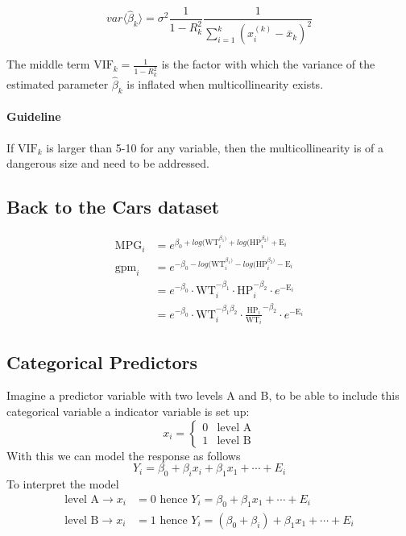 \documentclass[11pt]{article}
\begin{document}
\begin{equation*}
	var\langle \widehat{\beta}_k \rangle = \sigma^2 \frac{1}{1-R_k^2}\frac{1}{\sum_{i=1}^k (x_i^{(k)} - \bar{x}_k)^2}
\end{equation*}

The middle term $\text{VIF}_k = \frac{1}{1-R_k^2}$ is the factor with which the variance of the estimated parameter $\widehat{\beta}_k$ is inflated when multicollinearity exists.

\paragraph{Guideline} If $\text{VIF}_k$ is larger than 5-10 for any variable, then the multicollinearity is of a dangerous size and need to be addressed.

\subsection{Back to the Cars dataset}

\begin{align*}
	\text{MPG}_i &= e^{\beta_0 + log(\text{WT}_i ^ {\beta_1)} + log(\text{HP}_i ^ {\beta_2)} + \text{E}_i}\\
	\text{gpm}_i &= e^{- \beta_0 - log(\text{WT}_i ^ {\beta_1)} - log(\text{HP}_i ^ {\beta_2)} - \text{E}_i}\\
	&= e^{-\beta_0}\cdot \text{WT}_i^{-\beta_1} \cdot \text{HP}_i^{-\beta_2} \cdot e^{- \text{E}_i}\\
	&= e^{-\beta_0}\cdot \text{WT}_i^{-\beta_1\beta_2} \cdot \frac{\text{HP}_i}{\text{WT}_i}^{-\beta_2} \cdot e^{- \text{E}_i}
\end{align*}

\subsection{Categorical Predictors}
Imagine a predictor variable with two levels A and B, to be able to include this categorical variable a indicator variable is set up:
\begin{equation*}
	x_i = \left\{ \begin{matrix}
		0 & \text{level A}\\
		1 & \text{level B}
	\end{matrix}
	\right.
\end{equation*}
\noindent
With this we can model the response as follows
\begin{equation*}
	Y_i = \beta_0 + \beta_i x_i + \beta_1 x_1 + \cdots + E_i
\end{equation*}
\noindent
To interpret the model
\begin{align*}
	\text{level A} \rightarrow x_i &= 0 \text{ hence } Y_i = \beta_0 + \beta_1 x_1 + \cdots + E_i\\
	\text{level B} \rightarrow x_i &= 1 \text{ hence } Y_i = (\beta_0 + \beta_i) + \beta_1 x_1 + \cdots + E_i
\end{align*}
\end{document}
